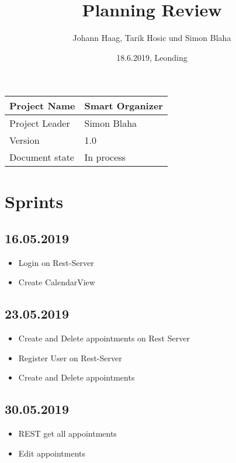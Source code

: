 \documentclass[12pt]{scrartcl}
\title{Planning Review}
\author{Johann Haag, Tarik Hosic und Simon Blaha}
\date{18.6.2019, Leonding}
\begin{document}
    \maketitle
    \begin{flushleft}
    \begin{tabular}{|l|l|}
    \hline
    Project Name & Smart Organizer \\ \hline
    Project Leader & Simon Blaha \\ \hline
    Version & 1.0\\ \hline
    Document state & In process \\ \hline
    \end{tabular}
    \end{flushleft}

    \pagebreak
    \tableofcontents
    \pagebreak

    \section{Sprints}
    \subsection{16.05.2019}
    \begin{itemize}
        \item Login on Rest-Server
        \item Create CalendarView
    \end{itemize}

    \subsection{23.05.2019}
    \begin{itemize}
        \item Create and Delete appointments on Rest Server
        \item Register User on Rest-Server
        \item Create and Delete appointments
    \end{itemize}

    \subsection{30.05.2019}
    \begin{itemize}
        \item REST get all appointments
        \item Edit appointments
    \end{itemize}
\end{document}
